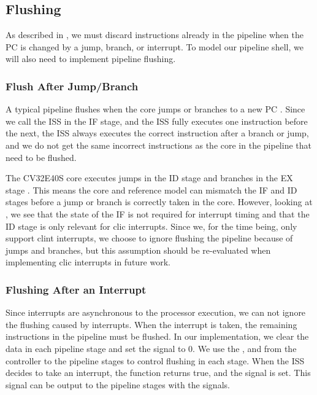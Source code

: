 \subsection{Flushing}

As described in , we must discard instructions already in the pipeline when the PC is changed by a jump, branch, or interrupt.
To model our pipeline shell, we will also need to implement pipeline flushing.

\subsubsection{Flush After Jump/Branch}

A typical pipeline flushes when the core jumps or branches to a new PC \cite{pattersonComputerOrganizationDesign2021}. Since we call the ISS in the IF stage, and the ISS fully executes one instruction before the next, the ISS always executes the correct instruction after a branch or jump, and we do not get the same incorrect instructions as the core in the pipeline that need to be flushed.

The CV32E40S core executes jumps in the ID stage and branches in the EX stage \cite{openhwgroupPipelineDetailsCOREV2023}. This means the core and reference model can mismatch the IF and ID stages before a jump or branch is correctly taken in the core. However, looking at , we see that the state of the IF is not required for interrupt timing and that the ID stage is only relevant for \acrshort{clic} interrupts. Since we, for the time being, only support \acrshort{clint} interrupts, we choose to ignore flushing the pipeline because of jumps and branches, but this assumption should be re-evaluated when implementing \acrshort{clic} interrupts in future work.


\subsubsection{Flushing After an Interrupt}

Since interrupts are asynchronous to the processor execution, we can not ignore the flushing caused by interrupts. When the interrupt is taken, the remaining instructions in the pipeline must be flushed. In our implementation, we clear the  data in each pipeline stage and set the  signal to 0. We use the , and  from the controller to the pipeline stages to control flushing in each stage. When the ISS decides to take an interrupt, the  function returns true, and the  signal is set. This signal can be output to the pipeline stages with the  signals.


